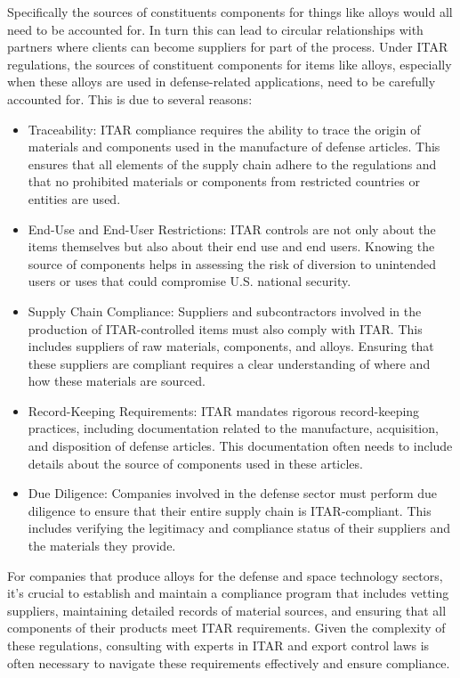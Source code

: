 \documentclass{tufte-handout}
\begin{document}
Specifically the sources of constituents components for things like alloys would all need to be accounted for. In turn this can lead to circular relationships with partners
where clients can become suppliers for part of the process. Under ITAR regulations, the sources of constituent components for items like alloys, especially when these alloys
are used in defense-related applications, need to be carefully accounted for. This is due to several reasons:

\begin{itemize}
\item Traceability: ITAR compliance requires the ability to trace the origin of materials and components used in the manufacture of defense articles. This ensures that all
elements of the supply chain adhere to the regulations and that no prohibited materials or components from restricted countries or entities are used.
\item End-Use and End-User Restrictions: ITAR controls are not only about the items themselves but also about their end use and end users. Knowing the source of components
helps in assessing the risk of diversion to unintended users or uses that could compromise U.S. national security.
\item Supply Chain Compliance: Suppliers and subcontractors involved in the production of ITAR-controlled items must also comply with ITAR. This includes suppliers of raw materials,
components, and alloys. Ensuring that these suppliers are compliant requires a clear understanding of where and how these materials are sourced.
\item Record-Keeping Requirements: ITAR mandates rigorous record-keeping practices, including documentation related to the manufacture, acquisition,
and disposition of defense articles. This documentation often needs to include details about the source of components used in these articles.
\item Due Diligence: Companies involved in the defense sector must perform due diligence to ensure that their entire supply chain is ITAR-compliant.
This includes verifying the legitimacy and compliance status of their suppliers and the materials they provide.
\end{itemize}

For companies that produce alloys for the defense and space technology sectors, it's crucial to establish and maintain a compliance program that includes vetting suppliers,
maintaining detailed records of material sources, and ensuring that all components of their products meet ITAR requirements. Given the complexity of these regulations,
consulting with experts in ITAR and export control laws is often necessary to navigate these requirements effectively and ensure compliance.
\end{document}
